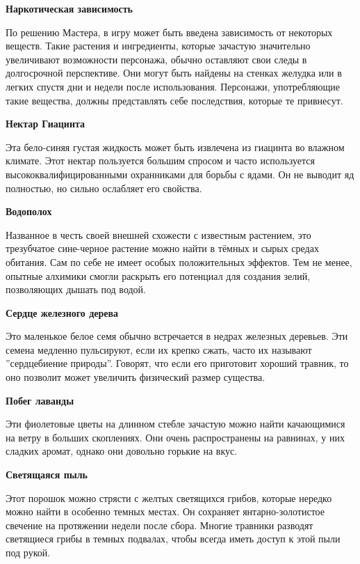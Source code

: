 \documentclass[a4paper, 9pt, twocolumn]{book}
\newenvironment {dndtable}
{
		\bigskip
		\centering
		\begin{tcolorbox}
			[enhanced, 
			sharp corners,
			colback=framecolor, 
			boxrule = 0pt, 
			overlay={
				\begin{tcbinvclipframe}
					\path[fill=black] ([xshift=10pt,yshift=7pt]frame.north west) --
					(frame.north west) --
					(frame.north east) --
					([xshift=-10pt, yshift=7pt]frame.north east) --
					([xshift=-10pt, yshift=2pt]frame.north east) --
					([xshift=10pt,yshift=2pt]frame.north west) -- cycle;
					
					\path[fill=black] ([xshift=10pt,yshift=-7pt]frame.south west) --
					(frame.south west) --
					(frame.south east) --
					([xshift=-10pt, yshift=-7pt]frame.south east) --
					([xshift=-10pt, yshift=-2pt]frame.south east) --
					([xshift=10pt,yshift=-2pt]frame.south west) -- cycle;
				\end{tcbinvclipframe}
			}
			]}
{\end{tcolorbox}}
\newcommand{\partc}[2][]{{
		\bigskip
		\noindent
		\hspace{-0.25cm}
		\fontsize{11pt}{13.2}
		\color{sectioncolor}
		\textbf{#2}}
	
	{
		\ifx\relax#1\relax
		\else
		\noindent
		\normalcolor
		\textbf{#1}}
	\bigskip
	\fi
}
\begin{document}
	\begin{dndtable}
		
		{\Large \textbf{Наркотическая зависимость}}
		
		\noindent По решению Мастера, в игру может быть введена зависимость от некоторых веществ. Такие растения и ингредиенты, которые зачастую значительно увеличивают возможности персонажа, обычно оставляют свои следы в долгосрочной перспективе. Они могут быть найдены на стенках желудка или в легких спустя дни и недели после использования. Персонажи, употребляющие такие вещества, должны представлять себе последствия, которые те привнесут.
		
	\end{dndtable}
	
	
	
	\partc{Нектар Гиацинта}
	
	\noindent Эта бело-синяя густая жидкость может быть извлечена из гиацинта во влажном климате. Этот нектар пользуется большим спросом и часто используется высококвалифицированными охранниками для борьбы с ядами. Он не выводит яд полностью, но сильно ослабляет его свойства.
	
	\partc{Водополох}
	
	\noindent Названное в честь своей внешней схожести с известным растением, это трезубчатое сине-черное растение можно найти в тёмных и сырых средах обитания. Сам по себе не имеет особых положительных эффектов. Тем не менее, опытные алхимики смогли раскрыть его потенциал для создания зелий, позволяющих дышать под водой.
	
	\partc{Сердце железного дерева}
	
	\noindent Это маленькое белое семя обычно встречается в недрах железных деревьев. Эти семена медленно пульсируют, если их крепко сжать, часто их называют ''сердцебиение природы''. Говорят, что если его приготовит хороший травник, то оно позволит может увеличить физический размер существа.
	
	\partc{Побег лаванды}
	
	\noindent Эти фиолетовые цветы на длинном стебле зачастую можно найти качающимися на ветру в больших скоплениях. Они очень распространены на равнинах, у них сладких аромат, однако они довольно горькие на вкус.

	\partc{Светящаяся пыль}
	
	\noindent Этот порошок можно стрясти с желтых светящихся грибов, которые нередко можно найти в особенно темных местах. Он сохраняет янтарно-золотистое свечение на протяжении недели после сбора. Многие травники разводят светящиеся грибы в темных подвалах, чтобы всегда иметь доступ к этой пыли под рукой.
	
\end{document}
